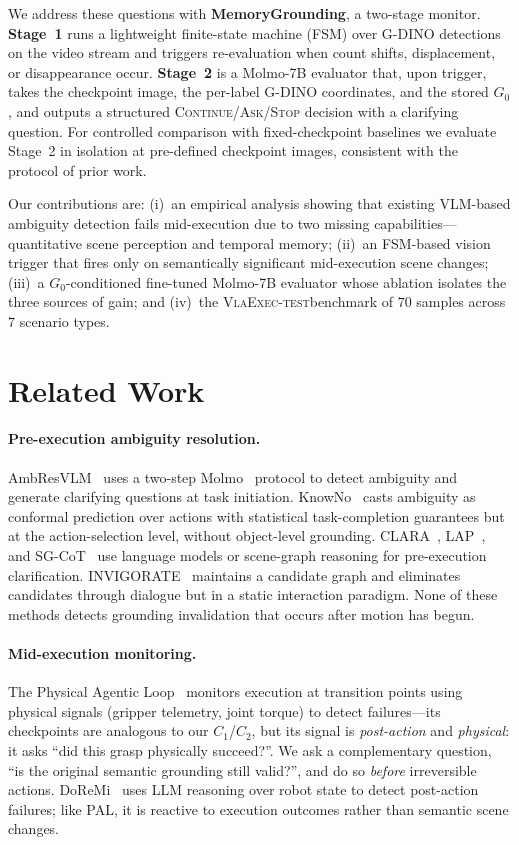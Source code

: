 \documentclass{article}
\newcommand{\datasettest}{\textsc{VlaExec-test}}
\begin{document}
We address these questions with \textbf{MemoryGrounding}, a two-stage
monitor. \textbf{Stage~1} runs a lightweight finite-state machine (FSM)
over G-DINO detections on the video stream and triggers re-evaluation
when count shifts, displacement, or disappearance occur.
\textbf{Stage~2} is a Molmo-7B evaluator that, upon trigger, takes the
checkpoint image, the per-label G-DINO coordinates, and the stored
$G_0$, and outputs a structured \textsc{Continue}/\textsc{Ask}/\textsc{Stop}
decision with a clarifying question. For controlled comparison with
fixed-checkpoint baselines we evaluate Stage~2 in isolation at
pre-defined checkpoint images, consistent with the protocol of prior
work.

Our contributions are: (i)~an empirical analysis showing that existing
VLM-based ambiguity detection fails mid-execution due to two missing
capabilities---quantitative scene perception and temporal memory;
(ii)~an FSM-based vision trigger that fires only on semantically
significant mid-execution scene changes; (iii)~a $G_0$-conditioned
fine-tuned Molmo-7B evaluator whose ablation isolates the three sources
of gain; and (iv)~the \datasettest benchmark of $70$
samples across $7$ scenario types.

\section{Related Work}
\label{sec:related}

\paragraph{Pre-execution ambiguity resolution.}
AmbResVLM~\cite{ambresvlm} uses a two-step Molmo~\cite{molmo} protocol
to detect ambiguity and generate clarifying questions at task
initiation. KnowNo~\cite{knowno} casts ambiguity as conformal prediction
over actions with statistical task-completion guarantees but at the
action-selection level, without object-level grounding.
CLARA~\cite{clara}, LAP~\cite{lap}, and SG-CoT~\cite{sgcot} use language
models or scene-graph reasoning for pre-execution clarification.
INVIGORATE~\cite{invigorate} maintains a candidate graph and eliminates
candidates through dialogue but in a static interaction paradigm. None
of these methods detects grounding invalidation that occurs after motion
has begun.

\paragraph{Mid-execution monitoring.}
The Physical Agentic Loop~\cite{pal} monitors execution at transition
points using physical signals (gripper telemetry, joint torque) to
detect failures---its checkpoints are analogous to our $C_1$/$C_2$, but
its signal is \emph{post-action} and \emph{physical}: it asks ``did this
grasp physically succeed?''. We ask a complementary question, ``is the
original semantic grounding still valid?'', and do so \emph{before}
irreversible actions. DoReMi~\cite{doremi} uses LLM reasoning over robot
state to detect post-action failures; like PAL, it is reactive to
execution outcomes rather than semantic scene changes.
\end{document}
